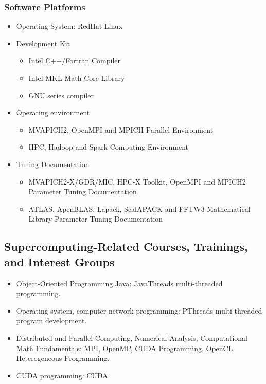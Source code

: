 \documentclass{mcmthesis}
\begin{document}
\newpage

\subsubsection{Software Platforms}

\begin{itemize}
	\item Operating System: RedHat Linux
	\item Development Kit
	\begin{itemize}
		\item Intel C++/Fortran Compiler
		\item Intel MKL Math Core Library
		\item GNU series compiler
	\end{itemize}
	\item Operating environment
	\begin{itemize}
		\item MVAPICH2, OpenMPI and MPICH Parallel Environment
		\item HPC, Hadoop and Spark Computing Environment
	\end{itemize}
	\item Tuning Documentation
	\begin{itemize}
		\item MVAPICH2-X/GDR/MIC,  HPC-X Toolkit, OpenMPI and MPICH2 Parameter Tuning Documentation
		\item ATLAS, ApenBLAS, Lapack, ScalAPACK and FFTW3 Mathematical Library Parameter Tuning Documentation
	\end{itemize}
\end{itemize}


\subsection{Supercomputing-Related Courses, Trainings, and Interest Groups}


\begin{itemize}
	\item Object-Oriented Programming Java: JavaThreads multi-threaded programming.
	\item Operating system, computer network programming: PThreads multi-threaded program development.
	\item Distributed and Parallel Computing, Numerical Analysis, Computational Math Fundamentals: MPI, OpenMP, CUDA Programming, OpenCL Heterogeneous Programming.
	\item CUDA programming: CUDA.
\end{itemize}
\end{document}
